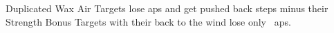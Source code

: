 
  {Duplicated}%
  {Wax}%
  {Air}%
  {}%
  {Targets lose  \glspl{ap} and get pushed back  \glspl{step} minus their Strength Bonus}%
  {Targets with their back to the wind lose only
  \setcounter{track}{\value{spellPlusTwo}}%
  ~\glspl{ap}.}
